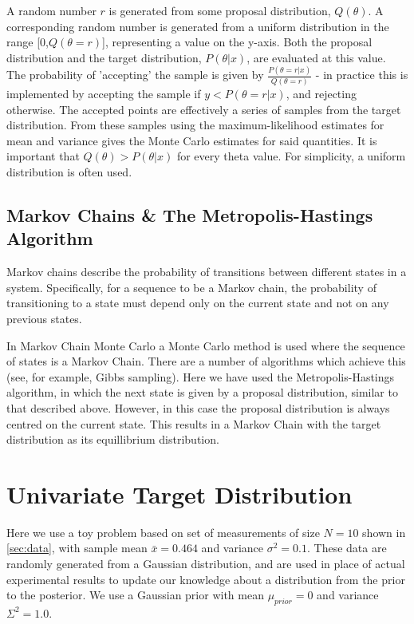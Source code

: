 \documentclass[a4paper,11pt,twoside]{article}
\begin{document}
A random number $r$ is generated from some proposal distribution, $Q(\theta)$. A
corresponding random number is generated from a uniform distribution in the
range [0,$Q(\theta = r)$], representing a value on the y-axis. Both the
proposal distribution and the target distribution, $P(\theta|x)$, are
evaluated at this value. The probability of 'accepting' the sample is given by
$\frac{P(\theta = r|x)}{Q(\theta = r)}$ - in practice this is implemented by accepting the
sample if $y < P(\theta = r|x)$, and rejecting otherwise. The accepted points are
effectively a series of samples from the target distribution. From these
samples using the maximum-likelihood estimates for mean and variance gives the
Monte Carlo estimates for said quantities. It is important that $Q(\theta) >
P(\theta|x)$ for every theta value. For simplicity, a uniform distribution is often used.

\subsection{Markov Chains \& The Metropolis-Hastings Algorithm}
Markov chains describe the probability of transitions between different states
in a system. Specifically, for a sequence to be a Markov chain, the
probability of transitioning to a state must depend only on the current state
and not on any previous states.

In Markov Chain Monte Carlo a Monte Carlo method is used where the sequence of
states is a Markov Chain. There are a number of algorithms which achieve this
(see, for example, Gibbs sampling).
Here we have used the Metropolis-Hastings algorithm, in which the next state is
given by a proposal distribution, similar to that described above. However,
in this case the proposal distribution is always centred on the current state.
This results in a Markov Chain with the target distribution as its equillibrium
distribution.

\section{Univariate Target Distribution}
Here we use a toy problem based on set of measurements of size $N = 10$ shown in \cref{sec:data}, with sample mean $\bar{x} = 0.464$ and variance $\sigma^2 = 0.1$.
These data are randomly generated from a Gaussian distribution, and are used in
place of actual experimental results to update our knowledge about a
distribution from the prior to the posterior. We use a Gaussian prior with mean
$\mu_{prior} = 0$ and variance $\Sigma^{2} = 1.0$.
\end{document}

